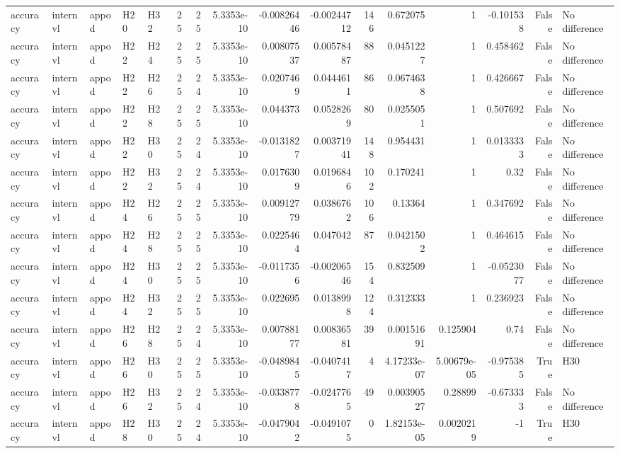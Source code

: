 \begin{longtable}{lllllrrrrrrrrrrl}
accuracy & internvl & appod & H20 & H32 & 25 & 25 & 5.3353e-10 & -0.00826446 & -0.00244712 & 146 & 0.672075 & 1 & -0.101538 & False & No difference \\
accuracy & internvl & appod & H22 & H24 & 25 & 25 & 5.3353e-10 & 0.00807537 & 0.00578487 & 88 & 0.0451227 & 1 & 0.458462 & False & No difference \\
accuracy & internvl & appod & H22 & H26 & 25 & 24 & 5.3353e-10 & 0.0207469 & 0.0444611 & 86 & 0.0674638 & 1 & 0.426667 & False & No difference \\
accuracy & internvl & appod & H22 & H28 & 25 & 25 & 5.3353e-10 & 0.044373 & 0.0528269 & 80 & 0.0255051 & 1 & 0.507692 & False & No difference \\
accuracy & internvl & appod & H22 & H30 & 25 & 24 & 5.3353e-10 & -0.0131827 & 0.00371941 & 148 & 0.954431 & 1 & 0.0133333 & False & No difference \\
accuracy & internvl & appod & H22 & H32 & 25 & 24 & 5.3353e-10 & 0.0176309 & 0.0196846 & 102 & 0.170241 & 1 & 0.32 & False & No difference \\
accuracy & internvl & appod & H24 & H26 & 25 & 25 & 5.3353e-10 & 0.00912779 & 0.0386762 & 106 & 0.13364 & 1 & 0.347692 & False & No difference \\
accuracy & internvl & appod & H24 & H28 & 25 & 25 & 5.3353e-10 & 0.0225464 & 0.047042 & 87 & 0.0421502 & 1 & 0.464615 & False & No difference \\
accuracy & internvl & appod & H24 & H30 & 25 & 25 & 5.3353e-10 & -0.0117356 & -0.00206546 & 154 & 0.832509 & 1 & -0.0523077 & False & No difference \\
accuracy & internvl & appod & H24 & H32 & 25 & 25 & 5.3353e-10 & 0.022695 & 0.0138998 & 124 & 0.312333 & 1 & 0.236923 & False & No difference \\
accuracy & internvl & appod & H26 & H28 & 25 & 24 & 5.3353e-10 & 0.00788177 & 0.00836581 & 39 & 0.00151691 & 0.125904 & 0.74 & False & No difference \\
accuracy & internvl & appod & H26 & H30 & 25 & 25 & 5.3353e-10 & -0.0489845 & -0.0407417 & 4 & 4.17233e-07 & 5.00679e-05 & -0.975385 & True & H30 \\
accuracy & internvl & appod & H26 & H32 & 25 & 24 & 5.3353e-10 & -0.0338778 & -0.0247765 & 49 & 0.00390527 & 0.28899 & -0.673333 & False & No difference \\
accuracy & internvl & appod & H28 & H30 & 25 & 24 & 5.3353e-10 & -0.0479042 & -0.0491075 & 0 & 1.82153e-05 & 0.0020219 & -1 & True & H30 \\

\end{longtable}
